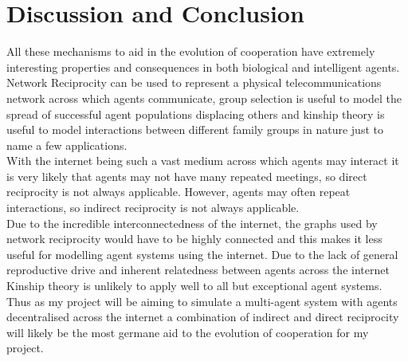\documentclass[twoside,twocolumn]{article}
\begin{document}

\section{Discussion and Conclusion}
All these mechanisms to aid in the evolution of cooperation have extremely interesting properties and consequences in both biological and intelligent agents. Network Reciprocity can be used to represent a physical telecommunications network across which agents communicate, group selection is useful to model the spread of successful agent populations displacing others and kinship theory is useful to model interactions between different family groups in nature just to name a few applications.\\
With the internet being such a vast medium across which agents may interact it is very likely that agents may not have many repeated meetings, so direct reciprocity is not always applicable. However, agents may often repeat interactions, so indirect reciprocity is not always applicable.\\
Due to the incredible interconnectedness of the internet, the graphs used by network reciprocity would have to be highly connected and this makes it less useful for modelling agent systems using the internet. Due to the lack of general reproductive drive and inherent relatedness between agents across the internet Kinship theory is unlikely to apply well to all but exceptional agent systems.\\
Thus as my project will be aiming to simulate a multi-agent system with agents decentralised across the internet a combination of indirect and direct reciprocity will likely be the most germane aid to the evolution of cooperation for my project.


{}


\end{document}
